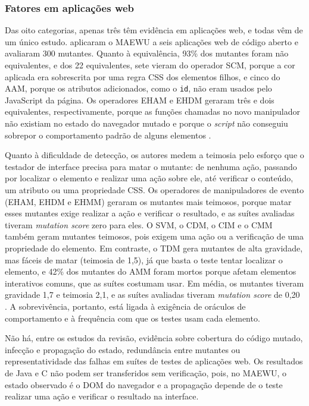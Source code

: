 \subsubsection{Fatores em aplicações web}
\label{subsubsec:fatores-web}

Das oito categorias, apenas três têm evidência em aplicações web, e todas vêm de um único estudo.  aplicaram o MAEWU a seis aplicações web de código aberto e avaliaram 300 mutantes. Quanto à equivalência, 93\% dos mutantes foram não equivalentes, e dos 22 equivalentes, sete vieram do operador SCM, porque a cor aplicada era sobrescrita por uma regra CSS dos elementos filhos, e cinco do AAM, porque os atributos adicionados, como o \texttt{id}, não eram usados pelo JavaScript da página. Os operadores EHAM e EHDM geraram três e dois equivalentes, respectivamente, porque as funções chamadas no novo manipulador não existiam no estado do navegador mutado e porque o \textit{script} não conseguiu sobrepor o comportamento padrão de alguns elementos \cite{yandrapally2021}.

Quanto à dificuldade de detecção, os autores medem a teimosia pelo esforço que o testador de interface precisa para matar o mutante: de nenhuma ação, passando por localizar o elemento e realizar uma ação sobre ele, até verificar o conteúdo, um atributo ou uma propriedade CSS. Os operadores de manipuladores de evento (EHAM, EHDM e EHMM) geraram os mutantes mais teimosos, porque matar esses mutantes exige realizar a ação e verificar o resultado, e as suítes avaliadas tiveram \textit{mutation score} zero para eles. O SVM, o CDM, o CIM e o CMM também geram mutantes teimosos, pois exigem uma ação ou a verificação de uma propriedade do elemento. Em contraste, o TDM gera mutantes de alta gravidade, mas fáceis de matar (teimosia de 1,5), já que basta o teste tentar localizar o elemento, e 42\% dos mutantes do AMM foram mortos porque afetam elementos interativos comuns, que as suítes costumam usar. Em média, os mutantes tiveram gravidade 1,7 e teimosia 2,1, e as suítes avaliadas tiveram \textit{mutation score} de 0,20 \cite{yandrapally2021}. A sobrevivência, portanto, está ligada à exigência de oráculos de comportamento e à frequência com que os testes usam cada elemento.

Não há, entre os estudos da revisão, evidência sobre cobertura do código mutado, infecção e propagação do estado, redundância entre mutantes ou representatividade das falhas em suítes de testes de aplicações web. Os resultados de Java e C não podem ser transferidos sem verificação, pois, no MAEWU, o estado observado é o DOM do navegador e a propagação depende de o teste realizar uma ação e verificar o resultado na interface.

